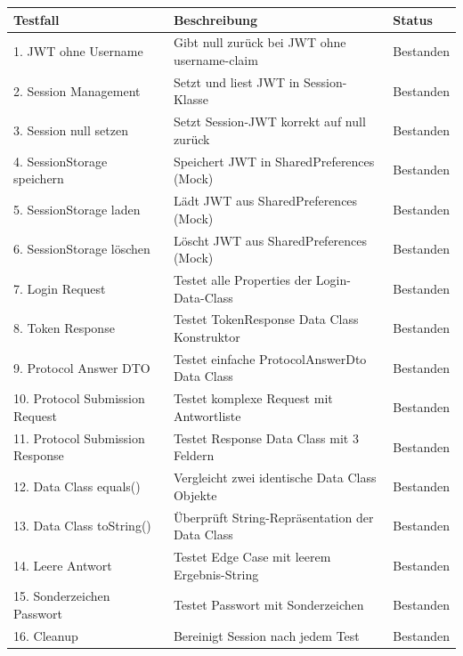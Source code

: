 \begin{tabularx}{\textwidth}{|l|X|l|}
\hline
\textbf{Testfall} & \textbf{ Beschreibung} & \textbf{Status} \\
\hline
1. JWT ohne Username & Gibt null zurück bei JWT ohne username-claim & Bestanden\\
\hline
2. Session Management & Setzt und liest JWT in Session-Klasse & Bestanden\\
\hline
3. Session null setzen & Setzt Session-JWT korrekt auf null zurück & Bestanden\\
\hline
4. SessionStorage speichern & Speichert JWT in SharedPreferences (Mock) & Bestanden\\
\hline
5. SessionStorage laden & Lädt JWT aus SharedPreferences (Mock) & Bestanden\\
\hline
6. SessionStorage löschen & Löscht JWT aus SharedPreferences (Mock) & Bestanden\\
\hline
7. Login Request & Testet alle Properties der Login-Data-Class & Bestanden\\
\hline
8. Token Response & Testet TokenResponse Data Class Konstruktor & Bestanden\\
\hline
9. Protocol Answer DTO & Testet einfache ProtocolAnswerDto Data Class & Bestanden\\
\hline
10. Protocol Submission Request & Testet komplexe Request mit Antwortliste & Bestanden\\
\hline
11. Protocol Submission Response & Testet Response Data Class mit 3 Feldern & Bestanden\\
\hline
12. Data Class equals() & Vergleicht zwei identische Data Class Objekte & Bestanden\\
\hline
13. Data Class toString() & Überprüft String-Repräsentation der Data Class & Bestanden\\
\hline
14. Leere Antwort & Testet Edge Case mit leerem Ergebnis-String & Bestanden\\
\hline
15. Sonderzeichen Passwort & Testet Passwort mit Sonderzeichen & Bestanden\\
\hline
16. Cleanup & Bereinigt Session nach jedem Test & Bestanden\\
\hline

\end{tabularx}

